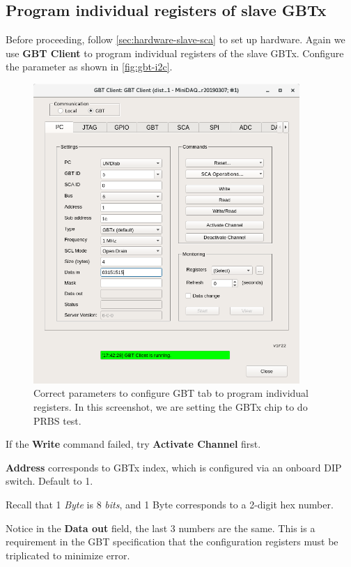 \subsection{Program individual registers of slave GBTx}
\label{sec:software-slave-individual}
Before proceeding, follow \autoref{sec:hardware-slave-sca} to set up hardware.
Again we use \textbf{GBT Client} to program individual registers of the slave
GBTx.
Configure the parameter as shown in \autoref{fig:gbt-i2c}.

\begin{figure}[ht]
    \centering
    \includegraphics[width=0.9\textwidth]{res/gbt_client_slave_gbt_i2c_test.png}
    \caption{
        Correct parameters to configure GBT \itwoc tab to program individual
        registers.
        In this screenshot, we are setting the GBTx chip to do PRBS test.
    }
    \label{fig:gbt-i2c}
\end{figure}

\begin{leftbar}
    If the \textbf{Write} command failed, try \textbf{Activate Channel} first.
\end{leftbar}

\begin{leftbar}
    \textbf{Address} corresponds to GBTx index, which is configured via an
    onboard DIP switch. Default to 1.
\end{leftbar}

\begin{leftbar}
    Recall that 1 \emph{Byte} is 8 \emph{bits}, and 1 Byte corresponds to a
    2-digit hex number.
\end{leftbar}

\begin{leftbar}
    Notice in the \textbf{Data out} field, the last 3 numbers are the same.
    This is a requirement in the GBT specification that the configuration
    registers must be triplicated to minimize error.
\end{leftbar}
